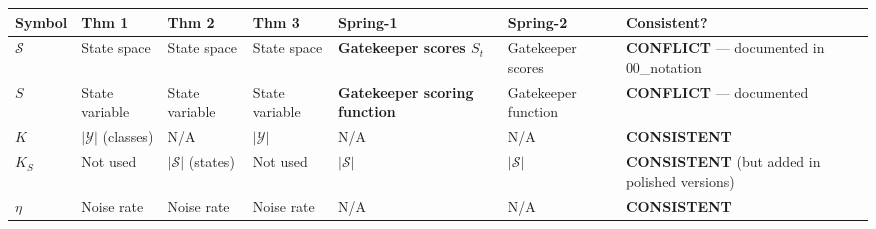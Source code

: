 \documentclass[
  12pt,
]{article}
\begin{document}
\begin{longtable}[]{@{}
  >{\raggedright\arraybackslash}p{}
  >{\raggedright\arraybackslash}p{}
  >{\raggedright\arraybackslash}p{}
  >{\raggedright\arraybackslash}p{}
  >{\raggedright\arraybackslash}p{}
  >{\raggedright\arraybackslash}p{}
  >{\raggedright\arraybackslash}p{}@{}}
\toprule\noalign{}
\begin{minipage}[b]{\linewidth}\raggedright
Symbol
\end{minipage} & \begin{minipage}[b]{\linewidth}\raggedright
Thm 1
\end{minipage} & \begin{minipage}[b]{\linewidth}\raggedright
Thm 2
\end{minipage} & \begin{minipage}[b]{\linewidth}\raggedright
Thm 3
\end{minipage} & \begin{minipage}[b]{\linewidth}\raggedright
Spring-1
\end{minipage} & \begin{minipage}[b]{\linewidth}\raggedright
Spring-2
\end{minipage} & \begin{minipage}[b]{\linewidth}\raggedright
Consistent?
\end{minipage} \\
\midrule\noalign{}
\endhead
\bottomrule\noalign{}
\endlastfoot
\(\mathcal{S}\) & State space & State space & State space &
\textbf{Gatekeeper scores \(S_t\)} & Gatekeeper scores &
\textbf{CONFLICT} --- documented in 00\_notation \\
\(S\) & State variable & State variable & State variable &
\textbf{Gatekeeper scoring function} & Gatekeeper function &
\textbf{CONFLICT} --- documented \\
\(K\) & \(|\mathcal{Y}|\) (classes) & N/A & \(|\mathcal{Y}|\) & N/A &
N/A & \textbf{CONSISTENT} \\
\(K_S\) & Not used & \(|\mathcal{S}|\) (states) & Not used &
\(|\mathcal{S}|\) & \(|\mathcal{S}|\) & \textbf{CONSISTENT} (but added
in polished versions) \\
\(\eta\) & Noise rate & Noise rate & Noise rate & N/A & N/A &
\textbf{CONSISTENT} \\

\end{longtable}
\end{document}
